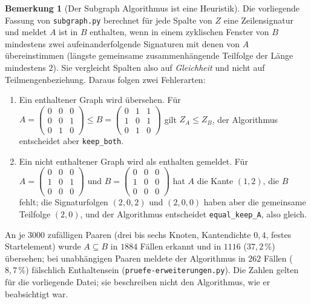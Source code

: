 \documentclass[a4paper,12pt, twoside]{report}
\theoremstyle{definition}
\newtheorem{bemerkung}{Bemerkung}
\begin{document}
\begin{bemerkung}[Der Subgraph Algorithmus ist eine Heuristik]
\label{bem:heuristik}
	Die vorliegende Fassung von \texttt{subgraph.py} berechnet für jede Spalte von $Z$ eine Zeilensignatur und meldet \glqq $A$ ist in $B$ enthalten\grqq, wenn in einem zyklischen Fenster von $B$ mindestens zwei aufeinanderfolgende Signaturen mit denen von $A$ übereinstimmen (längste gemeinsame zusammenhängende Teilfolge der Länge mindestens $2$). Sie vergleicht Spalten also auf \emph{Gleichheit} und nicht auf Teilmengenbeziehung. Daraus folgen zwei Fehlerarten:
	\begin{enumerate}[label=(\alph*)]
		\item Ein enthaltener Graph wird übersehen. Für
		$A = \begin{pmatrix}0&0&0\\0&0&1\\0&1&0\end{pmatrix} \le B = \begin{pmatrix}0&1&1\\1&0&1\\0&1&0\end{pmatrix}$
		gilt $Z_A \le Z_B$, der Algorithmus entscheidet aber \texttt{keep\_both}.
		\item Ein nicht enthaltener Graph wird als enthalten gemeldet. Für
		$A = \begin{pmatrix}0&0&0\\1&0&1\\0&0&0\end{pmatrix}$ und $B = \begin{pmatrix}0&0&0\\1&0&0\\0&0&0\end{pmatrix}$
		hat $A$ die Kante $(1,2)$, die $B$ fehlt; die Signaturfolgen $(2,0,2)$ und $(2,0,0)$ haben aber die gemeinsame Teilfolge $(2,0)$, und der Algorithmus entscheidet \texttt{equal\_keep\_A}, also \glqq gleich\grqq.
	\end{enumerate}
	An je $3000$ zufälligen Paaren (drei bis sechs Knoten, Kantendichte $0{,}4$, festes Startelement) wurde $A \subseteq B$ in $1884$ Fällen erkannt und in $1116$ ($37{,}2\,\%$) übersehen; bei unabhängigen Paaren meldete der Algorithmus in $262$ Fällen ($8{,}7\,\%$) fälschlich Enthaltensein (\texttt{pruefe-erweiterungen.py}). Die Zahlen gelten für die vorliegende Datei; sie beschreiben nicht den Algorithmus, wie er beabsichtigt war.
\end{bemerkung}
\end{document}
